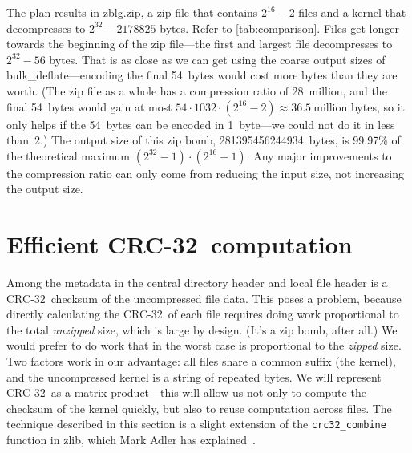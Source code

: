 \documentclass[letterpaper,twocolumn,10pt]{article}
\newcommand{\bulkdeflate}{\mbox{bulk\_deflate}}
\newcommand{\CRC}{\mbox{CRC-32}}
\begin{document}
The plan results in \mbox{zblg.zip}, a zip file
that contains $2^{16}-2$ files and a kernel that decompresses
to $2^{32}-\num{2178825}$ bytes.
Refer to \autoref{tab:comparison}.
Files get longer towards the beginning of the zip file---the
first and largest file decompresses to
$2^{32} - 56$ bytes.
That is as close as we can get using the coarse
output sizes of \bulkdeflate---encoding
the final \SI{54}{bytes} would cost more bytes than they are worth.
(The zip file as a whole has a compression ratio
of 28~million, and the final \SI{54}{bytes} would gain
at most $54\cdot 1032\cdot (2^{16}-2) \approx 36.5~\mathrm{million}$ bytes,
so it only helps if the \SI{54}{bytes} can be encoded
in \SI{1}{byte}---we could not do it in less than~\num{2}.)
The output size of this zip bomb, \SI{281395456244934}{bytes},
is 99.97\% of the theoretical maximum
$(2^{32}-1)\cdot(2^{16}-1)$.
Any major improvements to the compression ratio can only come
from reducing the input size,
not increasing the output size.


\section{Efficient \CRC\ computation}
\label{sec:crc32}

Among the metadata in the central directory header and local file header
is a \CRC\ checksum of the uncompressed file data.
This poses a problem, because directly calculating the \CRC\ of each file
requires doing work proportional to the total \emph{unzipped} size,
which is large by design. (It's a zip bomb, after all.)
We would prefer to do work that in the worst case is
proportional to the \emph{zipped} size.
Two factors work in our advantage:
all files share a common suffix (the kernel),
and the uncompressed kernel is a string of repeated bytes.
We will represent \CRC\ as a matrix product---this
will allow us not only to compute the checksum of the kernel quickly,
but also to reuse computation across files.
The technique described in this section is a slight extension of the
\texttt{crc32\_combine}
function in zlib,
which Mark Adler has explained~\cite{crc32combine}.
\end{document}
